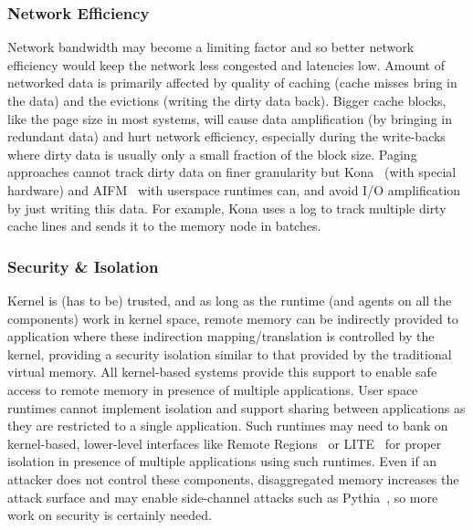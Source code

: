 \subsubsection{Network Efficiency}
Network bandwidth may become a limiting factor and so better 
network efficiency would keep the network less congested and 
latencies low. Amount of networked data is primarily affected 
by quality of caching (cache misses bring in the data) and 
the evictions (writing the dirty data back). Bigger cache
blocks, like the page size in most systems, will cause 
data amplification (by bringing in redundant data) and hurt 
network efficiency, especially during the write-backs where 
dirty data is usually only a small fraction of the block size. 
Paging approaches cannot track dirty data on finer granularity 
but Kona~\cite{kona} (with special hardware) and AIFM~\cite{aifm}
with userspace runtimes can, and avoid I/O amplification by just 
writing this data. For example, Kona uses a log to track multiple 
dirty cache lines and sends it to the memory node in batches.

\subsubsection{Security \& Isolation}
Kernel is (has to be) trusted, and as long as the 
runtime (and agents on all the components) work in 
kernel space, remote memory can be indirectly provided 
to application where these indirection mapping/translation 
is controlled by the kernel, providing a security 
isolation similar to that provided by the traditional 
virtual memory. All kernel-based systems provide this 
support to enable safe access to remote memory in presence
of multiple applications. User space runtimes cannot 
implement isolation and support sharing between 
applications as they are restricted to a single 
application. Such runtimes may need to 
bank on kernel-based, lower-level interfaces like 
Remote Regions~\cite{remregions} or LITE~\cite{literdma}
for proper isolation in presence of multiple applications 
using such runtimes. Even if an attacker does not 
control these components, disaggregated memory increases the 
attack surface and may enable side-channel attacks such as  
Pythia~\cite{Pythia}, so more work on security is certainly 
needed. 


